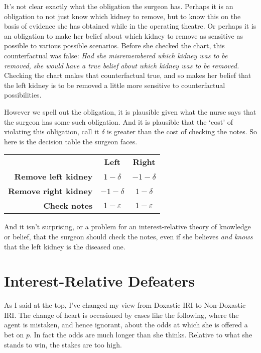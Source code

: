 \documentclass[11pt,oneside]{book}
\begin{document}
It's not clear exactly what the obligation the surgeon has. Perhaps it is an obligation to not just know which kidney to remove, but to know this on the basis of evidence she has obtained while in the operating theatre. Or perhaps it is an obligation to make her belief about which kidney to remove as sensitive as possible to various possible scenarios. Before she checked the chart, this counterfactual was false: \textit{Had she misremembered which kidney was to be removed, she would have a true belief about which kidney was to be removed.} Checking the chart makes that counterfactual true, and so makes her belief that the left kidney is to be removed a little more sensitive to counterfactual possibilities. 

However we spell out the obligation, it is plausible given what the nurse says that the surgeon has some such obligation. And it is plausible that the `cost' of violating this obligation, call it $\delta$ is greater than the cost of checking the notes. So here is the decision table the surgeon faces.

\begin{center}
\begin{tabular}{r c c}
 & \textbf{Left} & \textbf{Right} \\
\textbf{Remove left kidney} & $1-\delta$ & $-1-\delta$ \\
\textbf{Remove right kidney} & $-1-\delta$ & $1-\delta$ \\
\textbf{Check notes} & $1-\varepsilon$ & $1-\varepsilon$ \\
\end{tabular}
\end{center}

\noindent And it isn't surprising, or a problem for an interest-relative theory of knowledge or belief, that the surgeon should check the notes, even if she believes \textit{and knows} that the left kidney is the diseased one.
 
\section{Interest-Relative Defeaters}

As I said at the top, I've changed my view from Doxastic IRI to Non-Doxastic IRI. The change of heart is occasioned by cases like the following, where the agent is mistaken, and hence ignorant, about the odds at which she is offered a bet on $p$. In fact the odds are much longer than she thinks. Relative to what she stands to win, the stakes are too high.
\end{document}
